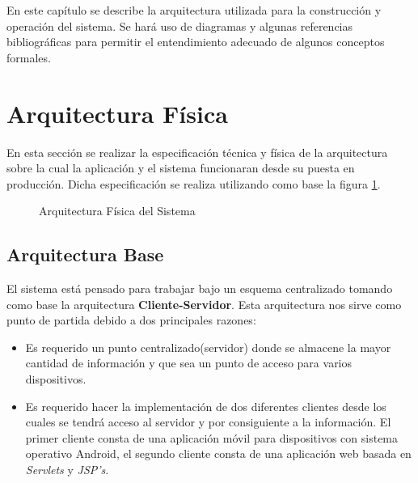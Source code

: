 En este capítulo se describe la arquitectura utilizada para la construcción y operación del sistema. Se hará uso de diagramas y algunas referencias bibliográficas para permitir el entendimiento adecuado de algunos conceptos formales.

\section{Arquitectura Física}

En esta sección se realizar la especificación técnica y física de la arquitectura sobre la cual la aplicación y el sistema funcionaran desde su puesta en producción. Dicha especificación se realiza utilizando como base la figura \ref{fig:arqFisica}.

\begin{figure}[hbtp!]
	\begin{center}
		\caption{Arquitectura Física del Sistema}
		\label{fig:arqFisica}
	\end{center}
\end{figure}

\subsection{Arquitectura Base}
El sistema está pensado para trabajar bajo un esquema centralizado tomando como base la arquitectura \textbf{Cliente-Servidor}. Esta arquitectura nos sirve como punto de partida debido a dos principales razones:
	\begin{itemize}
		\item Es requerido un punto centralizado(servidor) donde se almacene la mayor cantidad de información y que sea un punto de acceso para varios dispositivos.
		\item Es requerido hacer la implementación de dos diferentes clientes desde los cuales se tendrá acceso al servidor y por consiguiente a la información. El primer cliente consta de una aplicación móvil para dispositivos con sistema operativo Android, el segundo cliente consta de una aplicación web basada en \textit{Servlets} y \textit{JSP's}. 
	\end{itemize}

